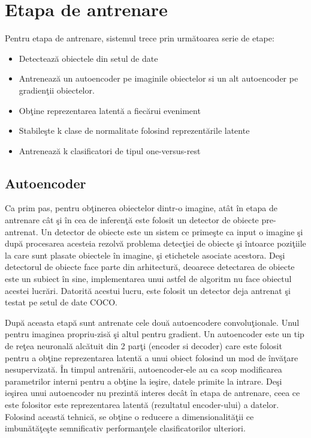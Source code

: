 \documentclass[a4paper,12pt]{report}
\begin{document}
\section{Etapa de antrenare}
Pentru etapa de antrenare, sistemul trece prin următoarea serie de etape: 
\begin{itemize}
\item Detectează obiectele din setul de date
\item Antrenează un autoencoder pe imaginile obiectelor si un alt autoencoder pe gradienţii obiectelor.
\item Obţine reprezentarea latentă a fiecărui eveniment
\item Stabileşte k clase de normalitate folosind reprezentările latente
\item Antrenează k clasificatori de tipul one-versus-rest
\end{itemize}
\subsection{Autoencoder}
\quad Ca prim pas, pentru obţinerea obiectelor dintr-o imagine, atât în etapa de antrenare cât şi în cea de inferenţă este folosit un detector de obiecte pre-antrenat. Un detector de obiecte este un sistem ce primeşte ca input o imagine şi după procesarea acesteia rezolvă problema detecţiei de obiecte şi întoarce poziţiile la care sunt plasate obiectele în imagine, şi etichetele asociate acestora. Deşi detectorul de obiecte face parte din arhitectură, deoarece detectarea de obiecte este un subiect în sine, implementarea unui astfel de algoritm nu face obiectul acestei lucrări. Datorită acestui lucru, este folosit un detector deja antrenat şi testat pe setul de date COCO. 
\par După aceasta etapă sunt antrenate cele două autoencodere convoluţionale. Unul pentru imaginea propriu-zisă şi altul pentru gradient. Un autoencoder este un tip de reţea neuronală alcătuit din 2 parţi (encoder si decoder) care este folosit pentru a obţine reprezentarea latentă a unui obiect folosind un mod de învăţare nesupervizată. În timpul antrenării, autoencoder-ele au ca scop modificarea parametrilor interni pentru a obţine la ieşire, datele primite la intrare. Deşi ieşirea unui autoencoder nu prezintă interes decât în etapa de antrenare, ceea ce este folositor este reprezentarea latentă (rezultatul encoder-ului) a datelor. Folosind această tehnică, se obţine o reducere a dimensionalităţii ce imbunătăţeşte semnificativ performanţele clasificatorilor ulteriori.
\par 
\end{document}
